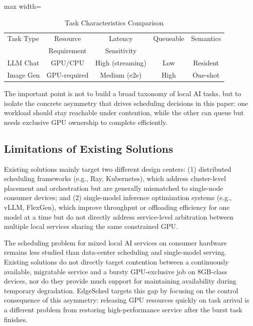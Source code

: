 \begin{table}[htbp]
\caption{Task Characteristics Comparison}
\label{tab:task_characteristics}
\centering
\small
\begin{adjustbox}{max width=\columnwidth}
\begin{tabular}{@{}lcccc@{}}
\toprule
Task Type & Resource & Latency & Queueable & Semantics \\
 & Requirement & Sensitivity &  &  \\
\midrule
LLM Chat & GPU/CPU & High (streaming) & Low & Resident \\
Image Gen & GPU-required & Medium (e2e) & High & One-shot \\
\bottomrule
\end{tabular}
\end{adjustbox}
\end{table}

The important point is not to build a broad taxonomy of local AI tasks, but to isolate the concrete asymmetry that drives scheduling decisions in this paper: one workload should stay reachable under contention, while the other can queue but needs exclusive GPU ownership to complete efficiently.

\subsection{Limitations of Existing Solutions}

Existing solutions mainly target two different design centers: (1) distributed scheduling frameworks (e.g., Ray, Kubernetes), which address cluster-level placement and orchestration but are generally mismatched to single-node consumer devices; and (2) single-model inference optimization systems (e.g., vLLM, FlexGen), which improve throughput or offloading efficiency for one model at a time but do not directly address service-level arbitration between multiple local services sharing the same constrained GPU.

The scheduling problem for mixed local AI services on consumer hardware remains less studied than data-center scheduling and single-model serving. Existing solutions do not directly target contention between a continuously available, migratable service and a bursty GPU-exclusive job on 8GB-class devices, nor do they provide much support for maintaining availability during temporary degradation. EdgeSched targets this gap by focusing on the control consequence of this asymmetry: releasing GPU resources quickly on task arrival is a different problem from restoring high-performance service after the burst task finishes.


